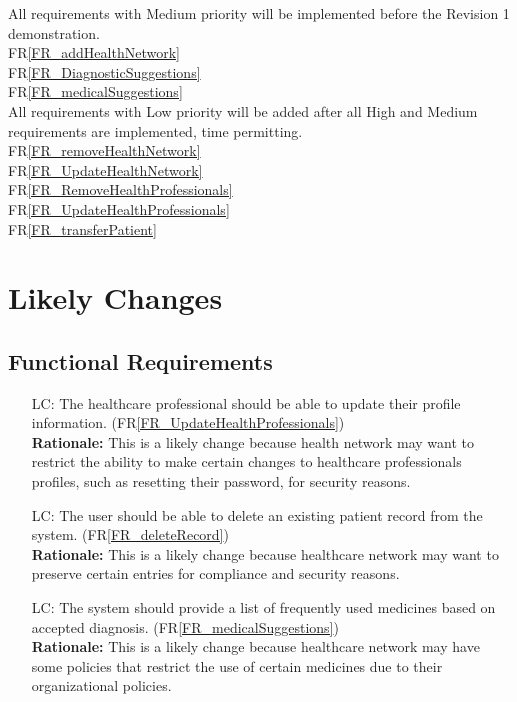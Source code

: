 \documentclass[12pt]{article}
\newcounter{lcnum} %
\begin{document}
All requirements with Medium priority will be implemented before the Revision 1 demonstration.\\
FR\ref{FR_addHealthNetwork}\\
FR\ref{FR_DiagnosticSuggestions}\\
FR\ref{FR_medicalSuggestions}\\

All requirements with Low priority will be added after all High and Medium requirements are implemented, time permitting.\\
FR\ref{FR_removeHealthNetwork}\\
FR\ref{FR_UpdateHealthNetwork}\\
FR\ref{FR_RemoveHealthProfessionals}\\
FR\ref{FR_UpdateHealthProfessionals}\\ 
FR\ref{FR_transferPatient}\\

\section{Likely Changes}

\subsection{Functional Requirements}
\noindent \begin{itemize}
\item[LC\refstepcounter{lcnum}\thelcnum\label{LC_profileUpdate}:] The healthcare professional should be able to update their profile information. (FR\ref{FR_UpdateHealthProfessionals})\\
\textbf{Rationale:} This is a likely change because health network may want to restrict the ability to make certain changes to healthcare professionals profiles, such as resetting their password, for security reasons.

\item[LC\refstepcounter{lcnum}\thelcnum\label{LC_patientDelete}:] The user should be able to delete an existing patient record from the system. (FR\ref{FR_deleteRecord})\\
\textbf{Rationale:} This is a likely change because healthcare network may want to preserve certain entries for compliance and security reasons.

\item[LC\refstepcounter{lcnum}\thelcnum\label{LC_addHealthNetwork}:] The system should provide a list of frequently used medicines based on accepted diagnosis. (FR\ref{FR_medicalSuggestions})\\
\textbf{Rationale:} This is a likely change because healthcare network may have some policies that restrict the use of certain medicines due to their organizational policies.
\end{itemize}
\end{document}
